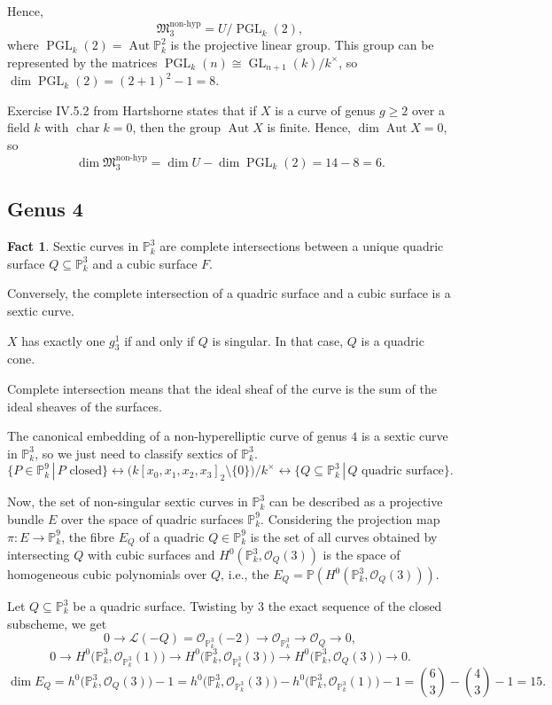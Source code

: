 \documentclass[12pt]{article}
\theoremstyle{definition}
\newtheorem*{fact}{Fact}
\DeclareMathOperator{\PGL}{PGL}
\DeclareMathOperator{\Aut}{Aut}
\DeclareMathOperator{\GL}{GL}
\DeclareMathOperator{\chara}{char}
\begin{document}
Hence,
\[\mathfrak{M}_3^{\text{non-hyp}}=U/\PGL_k(2),\]
where $\PGL_k(2)=\Aut\mathbb{P}_k^2$ is the projective linear group. This group can be represented by the matrices $\PGL_k(n)\cong\GL_{n+1}(k)/k^{\times}$, so $\dim\PGL_k(2)=(2+1)^{2}-1=8$.

Exercise IV.5.2 from Hartshorne states that if $X$ is a curve of genus $g\geq2$ over a field $k$ with $\chara k=0$, then the group $\Aut X$ is finite. Hence, $\dim\Aut X=0$, so
\[\dim\mathfrak{M}_3^{\text{non-hyp}}=\dim U-\dim\PGL_k(2)=14-8=6.\]

\subsection{Genus 4}
\begin{fact}
Sextic curves in $\mathbb{P}_k^3$ are complete intersections between a unique quadric surface $Q\subseteq\mathbb{P}_k^3$ and a cubic surface $F$.

Conversely, the complete intersection of a quadric surface and a cubic surface is a sextic curve.

$X$ has exactly one $g_3^1$ if and only if $Q$ is singular. In that case, $Q$ is a quadric cone.
\end{fact}

Complete intersection means that the ideal sheaf of the curve is the sum of the ideal sheaves of the surfaces.

The canonical embedding of a non-hyperelliptic curve of genus $4$ is a sextic curve in $\mathbb{P}_k^3$, so we just need to classify sextics of $\mathbb P_k^3$.
\[\{P\in\mathbb{P}_k^9\,|\,P\text{ closed}\}\longleftrightarrow \big(k[x_0,x_1,x_2,x_3]_2\setminus\{0\}\big)\big/k^{\times}\longleftrightarrow\{Q\subseteq\mathbb{P}_k^3\,|\,Q\text{ quadric surface}\}.\]

Now, the set of non-singular sextic curves in $\mathbb{P}_k^3$ can be described as a projective bundle $E$ over the space of quadric surfaces $\mathbb P_k^9$. Considering the projection map $\pi:E\rightarrow\mathbb{P}_k^9$, the fibre $E_Q$ of a quadric $Q\in\mathbb{P}_k^9$ is the set of all curves obtained by intersecting $Q$ with cubic surfaces and $H^0(\mathbb{P}_k^3,\mathcal{O}_Q(3))$ is the space of homogeneous cubic polynomials over $Q$, i.e., the $E_Q=\mathbb{P}(H^0(\mathbb{P}_k^3,\mathcal{O}_Q(3)))$.

Let $Q\subseteq\mathbb{P}_k^3$ be a quadric surface. Twisting by $3$ the exact sequence of the closed subscheme, we get
\[0\longrightarrow\mathcal{L}(-Q)=\mathcal{O}_{\mathbb{P}_k^3}(-2)\longrightarrow\mathcal{O}_{\mathbb{P}_k^3}\longrightarrow\mathcal{O}_Q\longrightarrow0,\]
\[0\longrightarrow H^0\big(\mathbb{P}_k^3,\mathcal{O}_{\mathbb{P}_k^3}(1)\big)\longrightarrow H^0\big(\mathbb{P}_k^3,\mathcal{O}_{\mathbb{P}_k^3}(3)\big)\longrightarrow H^0\big(\mathbb{P}_k^3,\mathcal{O}_Q(3)\big)\longrightarrow0.\]
\[\dim E_Q=h^0\big(\mathbb{P}_k^3,\mathcal{O}_Q(3)\big)-1=h^0\big(\mathbb{P}_k^3,\mathcal{O}_{\mathbb{P}_k^3}(3)\big)-h^0\big(\mathbb{P}_k^3,\mathcal{O}_{\mathbb{P}_k^3}(1)\big)-1=\binom{6}{3}-\binom{4}{3}-1=15.\]
\end{document}
